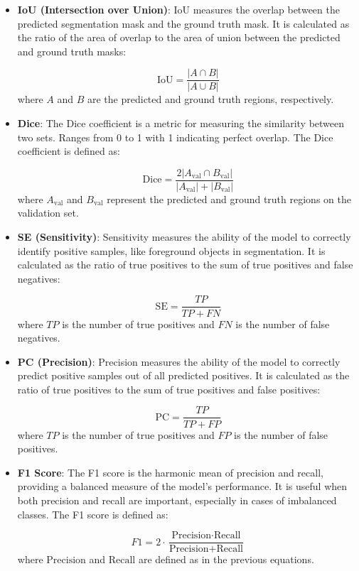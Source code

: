 \documentclass[lettersize,journal]{IEEEtran}
\begin{document}
\begin{itemize}
    \item \textbf{IoU (Intersection over Union)}: IoU measures the overlap between the predicted segmentation mask and the ground truth mask. It is calculated as the ratio of the area of overlap to the area of union between the predicted and ground truth masks:

    \[
    \text{IoU} = \frac{|A \cap B|}{|A \cup B|}
    \]
    where \( A \) and \( B \) are the predicted and ground truth regions, respectively.

    \item \textbf{Dice}: The Dice coefficient is a metric for measuring the similarity between two sets. Ranges from 0 to 1 with 1 indicating perfect overlap. The Dice coefficient is defined as:

    \[
    \text{Dice} = \frac{2 |A_{\text{val}} \cap B_{\text{val}}|}{|A_{\text{val}}| + |B_{\text{val}}|}
    \]
    where \( A_{\text{val}} \) and \( B_{\text{val}} \) represent the predicted and ground truth regions on the validation set.

    \item \textbf{SE (Sensitivity)}: Sensitivity measures the ability of the model to correctly identify positive samples, like foreground objects in segmentation. It is calculated as the ratio of true positives to the sum of true positives and false negatives:

    \[
    \text{SE} = \frac{TP}{TP + FN}
    \]
    where \( TP \) is the number of true positives and \( FN \) is the number of false negatives.

    \item \textbf{PC (Precision)}: Precision measures the ability of the model to correctly predict positive samples out of all predicted positives. It is calculated as the ratio of true positives to the sum of true positives and false positives:

    \[
    \text{PC} = \frac{TP}{TP + FP}
    \]
    where \( TP \) is the number of true positives and \( FP \) is the number of false positives.

    \item \textbf{F1 Score}: The F1 score is the harmonic mean of precision and recall, providing a balanced measure of the model’s performance. It is useful when both precision and recall are important, especially in cases of imbalanced classes. The F1 score is defined as:

    \[
    F1 = 2 \cdot \frac{\text{Precision} \cdot \text{Recall}}{\text{Precision} + \text{Recall}}
    \]
    where \(\text{Precision}\) and \(\text{Recall}\) are defined as in the previous equations.


\end{itemize}
\end{document}
